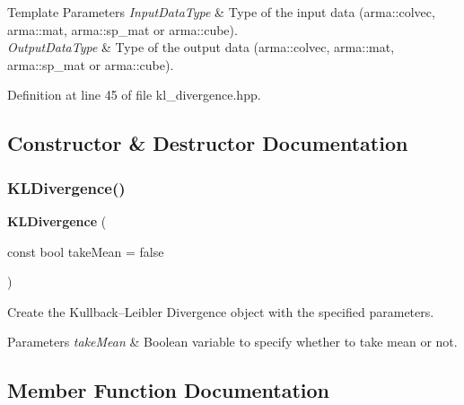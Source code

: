 \begin{DoxyTemplParams}{Template Parameters}
{\em Input\+Data\+Type} & Type of the input data (arma\+::colvec, arma\+::mat, arma\+::sp\+\_\+mat or arma\+::cube). \\
\hline
{\em Output\+Data\+Type} & Type of the output data (arma\+::colvec, arma\+::mat, arma\+::sp\+\_\+mat or arma\+::cube). \\
\hline
\end{DoxyTemplParams}


Definition at line 45 of file kl\+\_\+divergence.\+hpp.



\subsection{Constructor \& Destructor Documentation}
\mbox{\label{classmlpack_1_1ann_1_1KLDivergence_a16755dd3b869553b03796619adcb8e52}} 
\subsubsection{K\+L\+Divergence()}
{\footnotesize\ttfamily \textbf{ K\+L\+Divergence} (\begin{DoxyParamCaption}\item[{const bool}]{take\+Mean = {\ttfamily false} }\end{DoxyParamCaption})}



Create the Kullback–\+Leibler Divergence object with the specified parameters. 


\begin{DoxyParams}{Parameters}
{\em take\+Mean} & Boolean variable to specify whether to take mean or not. \\
\hline
\end{DoxyParams}


\subsection{Member Function Documentation}
\mbox{\label{classmlpack_1_1ann_1_1KLDivergence_add41dbaf358dc099750dc6064cb7e0d7}} 
